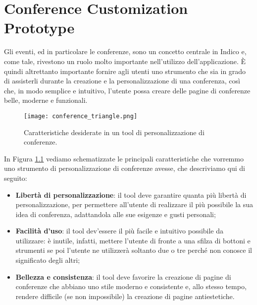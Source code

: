 \chapter{Conference Customization Prototype} \label{chap:conference_customization_prototype}

    Gli eventi, ed in particolare le conferenze, sono un concetto centrale in Indico e, come tale, rivestono un ruolo molto importante nell'utilizzo dell'applicazione. È quindi altrettanto importante fornire agli utenti uno strumento che sia in grado di assisterli durante la creazione e la personalizzazione di una conferenza, così che, in modo semplice e intuitivo, l'utente possa creare delle pagine di conferenze belle, moderne e funzionali.
    
    \begin{figure}[h!]
        \begin{center}
    		\texttt{[image: conference\_triangle.png]}
    	\end{center}
        \caption[Caratteristiche di un tool di personalizzazione di conferenze]{Caratteristiche desiderate in un tool di personalizzazione di conferenze.}
        \label{fig:conference_triangle}
    \end{figure}
    
    In Figura \ref{fig:conference_triangle} vediamo schematizzate le principali caratteristiche che vorremmo uno strumento di personalizzazione di conferenze avesse, che descriviamo qui di seguito:
    
    \begin{itemize}
        \item \textbf{Libertà di personalizzazione}: il tool deve garantire quanta più libertà di personalizzazione, per permettere all'utente di realizzare il più possibile la sua idea di conferenza, adattandola alle sue esigenze e gusti personali;
        \item \textbf{Facilità d'uso}: il tool dev'essere il più facile e intuitivo possibile da utilizzare: è inutile, infatti, mettere l'utente di fronte a una sfilza di bottoni e strumenti se poi l'utente ne utilizzerà soltanto due o tre perché non conosce il significato degli altri;
        \item \textbf{Bellezza e consistenza}: il tool deve favorire la creazione di pagine di conferenze che abbiano uno stile moderno e consistente e, allo stesso tempo, rendere difficile (se non impossibile) la creazione di pagine antiestetiche.
    \end{itemize}
    

